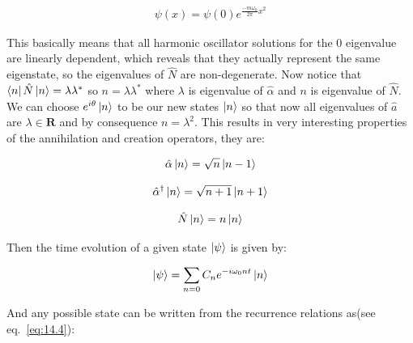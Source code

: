 \documentclass[
  journal=largetwo,
  year=2023,
]{cup-journal}
\begin{document}
\begin{equation}
  \begin{aligned}\label{eq:14.2}
    \psi(x) = \psi(0)e^{\frac{-m\omega_0}{2\pi}x^2}
  \end{aligned}
\end{equation}


This basically means that all harmonic oscillator solutions for the 0 eigenvalue are linearly dependent, which reveals that they actually represent the same eigenstate, so the eigenvalues of \(\hat{N}\) are non-degenerate. Now notice that \(\bra{n}\hat{N}\ket{n} = \lambda\lambda^{*}\) so \(n = \lambda\lambda^{*}\) where \(\lambda\) is eigenvalue of \(\hat{\alpha}\) and \(n\) is eigenvalue of \(\hat{N}\). We can choose \(e^{i\theta}\ket{n}\) to be our new states \(\ket{n}\) so that now all eigenvalues of \(\hat{a}\) are \(\lambda \in \textbf{R}\) and by consequence \(n = \lambda^2\). This results in very interesting properties of the annihilation and creation operators, they are:

\begin{equation}
  \begin{aligned}\label{eq:14.3}
    \hat{\alpha}\ket{n} = \sqrt{n}\ket{n-1}
  \end{aligned}
\end{equation}

\begin{equation}
  \begin{aligned}\label{eq:14.4}
    \hat{\alpha}^{\dag}\ket{n} = \sqrt{n+1}\ket{n+1}
  \end{aligned}
\end{equation}

\begin{equation}
  \begin{aligned}\label{eq:14.5}
    \hat{N}\ket{n} = n\ket{n}
  \end{aligned}
\end{equation}

Then the time evolution of a given state \(\ket{\psi}\) is given by:

\begin{equation}
  \begin{aligned}\label{eq:14.6}
    \ket{\psi} = \sum_{n=0}{C_n e^{-i\omega_0nt}\ket{n}}
  \end{aligned}
\end{equation}

And any possible state can be written from the recurrence relations as(see eq.~\ref{eq:14.4}):
\end{document}
